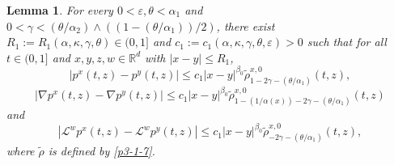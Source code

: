 \documentclass[a4paper,11pt]{amsart}
\renewcommand{\le}{\leqslant}
\newcommand{\R}{\mathds R}
\newcommand{\B}{\beta}
\newcommand{\T}{\theta}
\newcommand{\K}{\kappa}
\newcommand{\A}{\alpha}
\newcommand{\G}{\gamma}
\newcommand{\e}{ \varepsilon}
\def\LL{{\mathcal L}}
\newtheorem{lemma}[theorem]{Lemma}
\theoremstyle{definition}
\begin{document}
\begin{lemma}\label{l4-1}
For every $0<\varepsilon, \theta<\A_1$ and $0<\gamma<({\theta}/{\A_2})\wedge ((1-({\theta}/{\A_1}))/2)$,
there exist $R_1:=R_1(\A,\K,\G,\T)\in(0,1]$ and $c_1:=c_1(\A,\K,\G,\T,\e)>0$ such that
for all $t \in (0,1]$ and $x,y,z,w\in \R^d$ with $|x-y|\le R_1$,
\begin{equation}\label{l4-1-1}
|p^x(t,z)-p^y(t,z)|\le c_1|x-y|^{\B_0}\tilde \rho^{x,0}_{1-2\G-({\T}/{\A_1})}(t,z),\end{equation}
\begin{equation}\label{l4-1-1-1}\left|\nabla p^x(t,z)-\nabla p^y(t,z)\right|\le c_1|x-y|^{\B_0}\tilde \rho^{x,0}_{1-(1/\A(x))-2\G-
({\T}/{\A_1})}(t,z)
\end{equation}
and
\begin{equation}\label{l4-1-1a}
\left| \LL^w p^x(t,z)- \LL^w p^y(t,z)\right|\le c_1|x-y|^{\B_0}\tilde \rho^{x,0}_{-2\G-({\T}/{\A_1})}(t,z),
\end{equation}
where $\tilde \rho$ is defined by \eqref{p3-1-7}.
\end{lemma}
\end{document}
